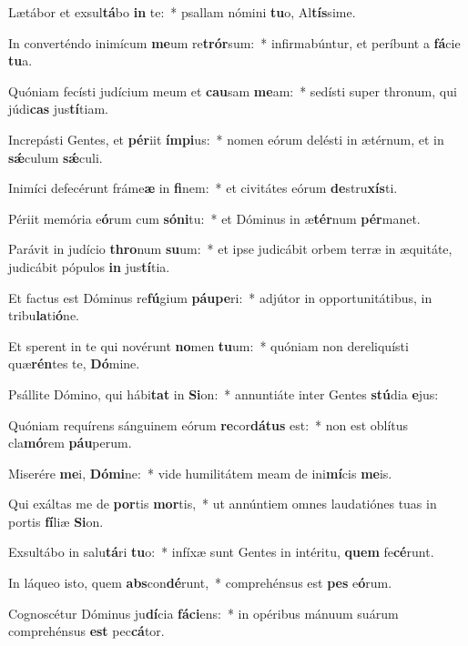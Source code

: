 \item Lætábor et exsul\textbf{tá}bo \textbf{in} te:~* psallam nómini \textbf{tu}o, Al\textbf{tís}sime.
\item In converténdo inimícum \textbf{me}um re\textbf{trór}sum:~* infirmabúntur, et períbunt a \textbf{fá}cie \textbf{tu}a.
\item Quóniam fecísti judícium meum et \textbf{cau}sam \textbf{me}am:~* sedísti super thronum, qui júdi\textbf{cas} jus\textbf{tí}tiam.
\item Increpásti Gentes, et \textbf{pér}iit \textbf{ím}\textbf{pi}us:~* nomen eórum delésti in ætérnum, et in \textbf{sǽ}culum \textbf{sǽ}culi.
\item Inimíci defecérunt fráme\textbf{æ} in \textbf{fi}nem:~* et civitátes eórum \textbf{de}stru\textbf{xís}ti.
\item Périit memória e\textbf{ó}rum cum \textbf{só}\textbf{ni}tu:~* et Dóminus in æ\textbf{tér}num \textbf{pér}manet.
\item Parávit in judício \textbf{thro}num \textbf{su}um:~* et ipse judicábit orbem terræ in æquitáte, judicábit pópulos \textbf{in} jus\textbf{tí}tia.
\item Et factus est Dóminus re\textbf{fú}gium \textbf{páu}\textbf{pe}ri:~* adjútor in opportunitátibus, in tribu\textbf{la}ti\textbf{ó}ne.
\item Et sperent in te qui novérunt \textbf{no}men \textbf{tu}um:~* quóniam non dereliquísti quæ\textbf{rén}tes te, \textbf{Dó}mine.
\item Psállite Dómino, qui hábi\textbf{tat} in \textbf{Si}on:~* annuntiáte inter Gentes \textbf{stú}dia \textbf{e}jus:
\item Quóniam requírens sánguinem eórum \textbf{re}cor\textbf{dá}\textbf{tus} est:~* non est oblítus cla\textbf{mó}rem \textbf{páu}perum.
\item Miserére \textbf{me}i, \textbf{Dó}\textbf{mi}ne:~* vide humilitátem meam de ini\textbf{mí}cis \textbf{me}is.
\item Qui exáltas me de \textbf{por}tis \textbf{mor}tis,~* ut annúntiem omnes laudatiónes tuas in portis \textbf{fí}liæ \textbf{Si}on.
\item Exsultábo in salu\textbf{tá}ri \textbf{tu}o:~* infíxæ sunt Gentes in intéritu, \textbf{quem} fe\textbf{cé}runt.
\item In láqueo isto, quem \textbf{abs}con\textbf{dé}runt,~* comprehénsus est \textbf{pes} e\textbf{ó}rum.
\item Cognoscétur Dóminus ju\textbf{dí}cia \textbf{fá}\textbf{ci}ens:~* in opéribus mánuum suárum comprehénsus \textbf{est} pec\textbf{cá}tor.
